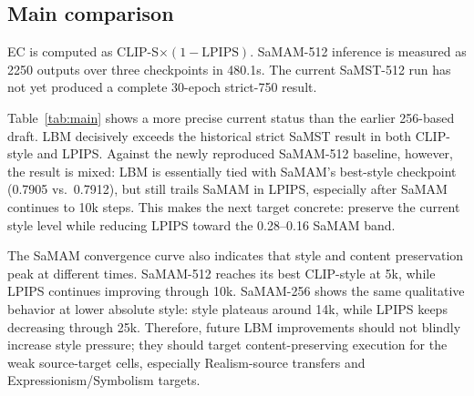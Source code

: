 ﻿\documentclass[letterpaper]{article}
\begin{document}
\subsection{Main comparison}
\begin{table}[t]
\centering
\caption{Current strict-750 comparison on the reproduced 512-style protocol. $\uparrow$ = higher is better, $\downarrow$ = lower is better. Inference time is end-to-end for 750 images when available.}
\label{tab:main}
\small
\setlength{\tabcolsep}{5pt}
\smallskip
\footnoterule\small
EC is computed as CLIP-S$\times(1-\mathrm{LPIPS})$. SaMAM-512 inference is measured as 2250 outputs over three checkpoints in 480.1s. The current SaMST-512 run has not yet produced a complete 30-epoch strict-750 result.
\end{table}

Table~\ref{tab:main} shows a more precise current status than the earlier 256-based draft. LBM decisively exceeds the historical strict SaMST result in both CLIP-style and LPIPS. Against the newly reproduced SaMAM-512 baseline, however, the result is mixed: LBM is essentially tied with SaMAM's best-style checkpoint (0.7905 vs.\ 0.7912), but still trails SaMAM in LPIPS, especially after SaMAM continues to 10k steps. This makes the next target concrete: preserve the current style level while reducing LPIPS toward the 0.28--0.16 SaMAM band.

The SaMAM convergence curve also indicates that style and content preservation peak at different times. SaMAM-512 reaches its best CLIP-style at 5k, while LPIPS continues improving through 10k. SaMAM-256 shows the same qualitative behavior at lower absolute style: style plateaus around 14k, while LPIPS keeps decreasing through 25k. Therefore, future LBM improvements should not blindly increase style pressure; they should target content-preserving execution for the weak source-target cells, especially Realism-source transfers and Expressionism/Symbolism targets.
\end{document}

